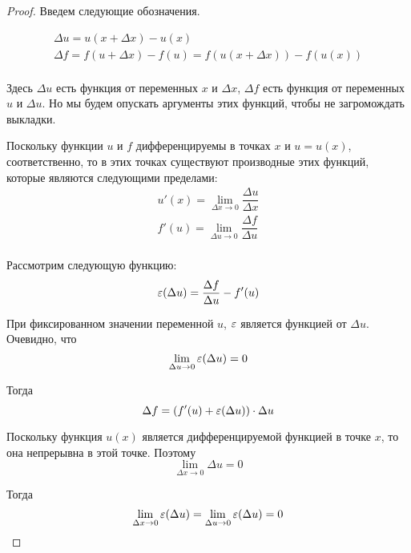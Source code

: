 \documentclass[a4paper]{article}
\theoremstyle{named}
\begin{document}
\begin{colloq}
		\begin{proof}
			Введем следующие обозначения.

			\[\begin{gathered}
				\Delta u = u(x + \Delta x) - u(x) \\
				\Delta f = f(u + \Delta x) - f(u) = f(u(x + \Delta x)) - f(u(x)) \\
			\end{gathered}\]

			Здесь $\Delta u$ есть функция от переменных $x$ и $\Delta x$, $\Delta f$ есть функция от переменных $u$ и $\Delta u$. Но мы будем опускать аргументы этих функций, чтобы не загромождать выкладки.

			Поскольку функции $u$ и $f$ дифференцируемы в точках $x$ и $u = u(x)$, соответственно, то в этих точках существуют производные этих функций, которые являются следующими пределами:
			\[\begin{gathered}
				u'(x) = \lim_{\Delta x \to 0} \dfrac{\Delta u}{\Delta x} \\
				f'(u) = \lim_{\Delta u \to 0} \dfrac{\Delta f}{\Delta u} \\
			\end{gathered}\]

			Рассмотрим следующую функцию:
			\begin{equation*}
				\varepsilon(\Delta u) = \dfrac{\Delta f}{\Delta u} - f'(u)
			\end{equation*}

			При фиксированном значении переменной $u$, $\varepsilon$ является функцией от $\Delta u$. Очевидно, что
			\begin{equation*}
				\lim_{\Delta u \to 0} \varepsilon(\Delta u) = 0
			\end{equation*}

			Тогда
			\begin{equation*}
				\Delta f = (f'(u) + \varepsilon(\Delta u)) \cdot \Delta u
			\end{equation*}

			Поскольку функция $u(x)$ является дифференцируемой функцией в точке $x$, то она непрерывна в этой точке. Поэтому
			\begin{equation*}
				\lim_{\Delta x \to 0} \Delta u = 0
			\end{equation*}

			Тогда
			\begin{equation*}
				\lim_{\Delta x \to 0} \varepsilon(\Delta u) = \lim_{\Delta u \to 0} \varepsilon(\Delta u) = 0
			\end{equation*}


\end{proof}
\end{colloq}
\end{document}

